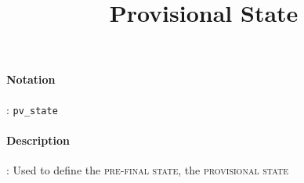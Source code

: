 \documentclass[10pt,a4paper,oneside]{scrartcl}
\author{}
\title{Provisional State}
\date{}
\begin{document}
\maketitle
\paragraph{Notation}: \texttt{pv\_state}
\paragraph{Description}: Used to define the \textsc{pre-final state}, the \textsc{provisional state}   
\end{document}
